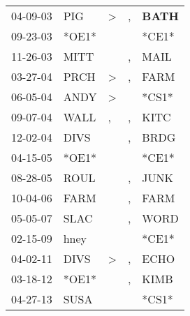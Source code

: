 \begin{supertabular}{p{0.07\textwidth}p{0.06\textwidth}p{0.02\textwidth}p{0.02\textwidth}p{0.06\textwidth}}
 04-09-03\textsuperscript{} &   PIG\textsuperscript{} &  \textgreater &  , &  \textbf{BATH\textsuperscript{}} \\
 09-23-03\textsuperscript{} &                   *OE1* &               &    &                            *CE1* \\
 11-26-03\textsuperscript{} &  MITT\textsuperscript{} &               &  , &           MAIL\textsuperscript{} \\
 03-27-04\textsuperscript{} &  PRCH\textsuperscript{} &  \textgreater &  , &           FARM\textsuperscript{} \\
 06-05-04\textsuperscript{} &  ANDY\textsuperscript{} &  \textgreater &    &                            *CS1* \\
 09-07-04\textsuperscript{} &  WALL\textsuperscript{} &             , &  , &           KITC\textsuperscript{} \\
 12-02-04\textsuperscript{} &  DIVS\textsuperscript{} &               &  , &           BRDG\textsuperscript{} \\
 04-15-05\textsuperscript{} &                   *OE1* &               &    &                            *CE1* \\
 08-28-05\textsuperscript{} &  ROUL\textsuperscript{} &               &  , &           JUNK\textsuperscript{} \\
 10-04-06\textsuperscript{} &  FARM\textsuperscript{} &               &  , &           FARM\textsuperscript{} \\
 05-05-07\textsuperscript{} &  SLAC\textsuperscript{} &               &  , &           WORD\textsuperscript{} \\
 02-15-09\textsuperscript{} &  hney\textsuperscript{} &               &    &                            *CE1* \\
 04-02-11\textsuperscript{} &  DIVS\textsuperscript{} &  \textgreater &  , &           ECHO\textsuperscript{} \\
 03-18-12\textsuperscript{} &                   *OE1* &               &  , &           KIMB\textsuperscript{} \\
 04-27-13\textsuperscript{} &  SUSA\textsuperscript{} &               &    &                            *CS1* \\
\end{supertabular}

